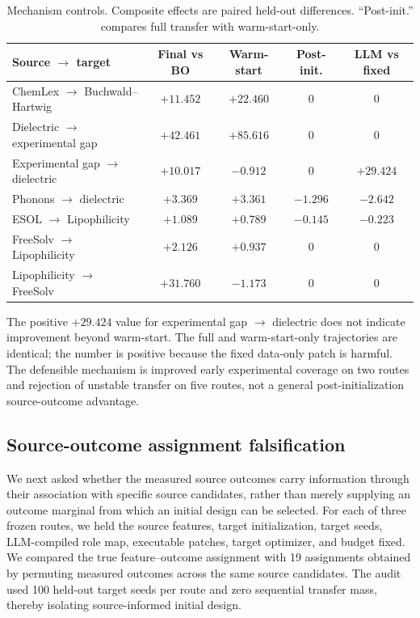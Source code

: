 \documentclass[pdflatex,sn-nature]{sn-jnl}
\begin{document}
\begin{appendices}
\begin{table}[t]
\centering
\caption{Mechanism controls. Composite effects are paired held-out differences.
``Post-init.'' compares full transfer with warm-start-only.}
\label{tab:mechanism_controls}
\small
\begin{tabularx}{\textwidth}{>{\raggedright\arraybackslash}X c c c c}
\toprule
Source $\rightarrow$ target & Final vs BO & Warm-start & Post-init. & LLM vs fixed \\
\midrule
ChemLex $\rightarrow$ Buchwald--Hartwig & $+11.452$ & $+22.460$ & $0$ & $0$ \\
Dielectric $\rightarrow$ experimental gap & $+42.461$ & $+85.616$ & $0$ & $0$ \\
Experimental gap $\rightarrow$ dielectric & $+10.017$ & $-0.912$ & $0$ & $+29.424$ \\
Phonons $\rightarrow$ dielectric & $+3.369$ & $+3.361$ & $-1.296$ & $-2.642$ \\
ESOL $\rightarrow$ Lipophilicity & $+1.089$ & $+0.789$ & $-0.145$ & $-0.223$ \\
FreeSolv $\rightarrow$ Lipophilicity & $+2.126$ & $+0.937$ & $0$ & $0$ \\
Lipophilicity $\rightarrow$ FreeSolv & $+31.760$ & $-1.173$ & $0$ & $0$ \\
\bottomrule
\end{tabularx}
\end{table}

The positive $+29.424$ value for experimental gap $\rightarrow$ dielectric
does not indicate improvement beyond warm-start. The full and warm-start-only
trajectories are identical; the number is positive because the fixed data-only
patch is harmful. The defensible mechanism is improved early experimental
coverage on two routes and rejection of unstable transfer on five routes, not
a general post-initialization source-outcome advantage.

\subsection{Source-outcome assignment falsification}
\label{sec:outcome_falsification}

We next asked whether the measured source outcomes carry information through
their association with specific source candidates, rather than merely supplying
an outcome marginal from which an initial design can be selected. For each of
three frozen routes, we held the source features, target initialization, target
seeds, LLM-compiled role map, executable patches, target optimizer, and budget
fixed. We compared the true feature--outcome assignment with 19 assignments
obtained by permuting measured outcomes across the same source candidates. The
audit used 100 held-out target seeds per route and zero sequential transfer mass,
thereby isolating source-informed initial design.


\end{appendices}
\end{document}
